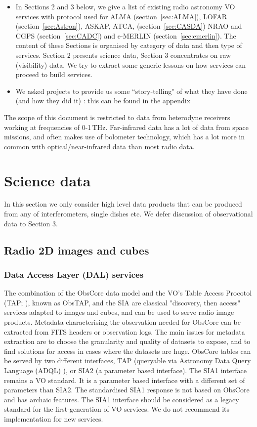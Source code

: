 \documentclass[11pt,a4paper]{ivoatex/ivoa}
\begin{document}
\begin{itemize}
\item  In Sections 2 and 3 below, we give a list of existing radio astronomy VO services with protocol 
used for ALMA (section~\ref{sec:ALMA}), LOFAR (section~\ref{sec:Astron}), ASKAP, ATCA,
(section~\ref{sec:CASDA}) NRAO and CGPS (section~\ref{sec:CADC}) and e-MERLIN (section~\ref{sec:emerlin}).
The content of these Sections is organised  by category of data and then type of services. Section 2 
presents science data, Section 3 concentrates on raw (visibility) data. We try to extract some generic 
lessons on how services can proceed to build services.
\item We asked projects to provide us some ``story-telling" of what they have done (and how they did 
it) : this can be found in the appendix
\end{itemize}

The scope of this document is restricted to data from heterodyne receivers working at frequencies of 
0-1\,THz. Far-infrared data has a lot of data from space missions, and often makes use of bolometer 
technology, which has a lot more in common with optical/near-infrared data than most radio data.

\section{Science data}

In this section we only consider high level data products that can be produced from any of 
interferometers, single dishes etc. We defer discussion of observational data to Section 3.   



\subsection{Radio 2D images and cubes}
\subsubsection{Data Access Layer (DAL) services}
The combination of the ObsCore data model and the VO's Table Access Procotol (TAP; \cite{std:TAP}), 
known as ObsTAP, and the SIA are classical "discovery, then access" services adapted to images and 
cubes, and can be used to serve radio image products. Metadata characterising the observation needed for 
ObsCore can be extracted from FITS headers or observation logs. The main issues for metadata extraction 
are to choose the granularity and quality of datasets to expose, and to find solutions for access in 
cases where the datasets are huge. ObsCore tables can be served by two different interfaces, TAP  
(queryable via Astronomy Data Query Language (ADQL) \citep{2008ivoa.spec.1030O} ), or SIA2 (a parameter 
based interface). The SIA1 interface remains a VO standard. It is a parameter based interface with a 
different set of parameters than SIA2. The standardised SIA1 response is not based on ObsCore and has 
archaic features. The SIA1 interface should be considered as a legacy standard for the first-generation 
of VO services. We do not recommend its implementation for new services. 
\end{document}
